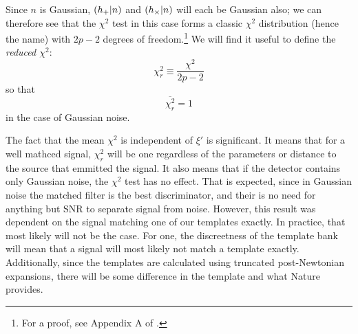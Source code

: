 Since $n$ is Gaussian, $(h_{+}|n)$ and $(h_{\times}|n)$ will each be Gaussian also; we can therefore see that the $\chi^2$ test in this case forms a classic $\chi^2$ distribution (hence the name) with $2p -2$ degrees of freedom.\footnote{For a proof, see Appendix A of \cite{ref:Allen:2006}.} We will find it useful to define the \emph{reduced $\chi^2$}:
\begin{equation}
\label{eqn:reduced_chisq}
\chi^2_{r} \equiv \frac{\chi^2}{2p - 2}
\end{equation}
so that
\begin{equation*}
\overline{\chi^2_{r}} = 1
\end{equation*}
in the case of Gaussian noise.

The fact that the mean $\chi^2$ is independent of $\xi'$ is significant. It means that for a well mathced signal, $\chi^2_r$ will be one regardless of the parameters or distance to the source that emmitted the signal. It also means that if the detector contains only Gaussian noise, the $\chi^2$ test has no effect. That is expected, since in Gaussian noise the matched filter is the best discriminator, and their is no need for anything but \ac{SNR} to separate signal from noise. However, this result was dependent on the signal matching one of our templates exactly. In practice, that most likely will not be the case. For one, the discreetness of the template bank will mean that a signal will most likely not match a template exactly. Additionally, since the templates are calculated using truncated post-Newtonian expansions, there will be some difference in the template and what Nature provides.

